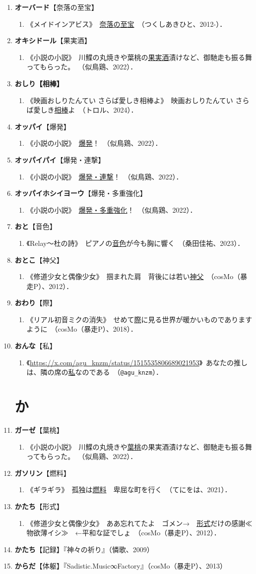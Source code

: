 \documentclass[twocolumn]{jsbook}
\newcommand{\exsentence}[3]{\item 《#1》\ #2\ （#3）．}
\newcommand{\exlist}[1]{
\begin{enumerate}[label= \raise0.2ex\hbox{\textcircled{\scriptsize{\arabic*}}}]
        #1
\end{enumerate}
}
\newcommand{\NoLabSectionTable}[1]{
    \section*{#1}
    \addcontentsline{toc}{section}{#1}
}
\begin{document}
\begin{enumerate}
    \item \textbf{オーバード}【奈落の至宝】
    \exlist{
        \exsentence{メイドインアビス}{\uline{奈落の至宝}}{つくしあきひと、2012-}
    }
    \item \textbf{オキシドール}【果実酒】
    \exlist{
        \exsentence{小説の小説}{川鰈の丸焼きや葉桃の\uline{果実酒}漬けなど、御馳走も振る舞ってもらった。}{似鳥鶏、2022}
    }
    \item \textbf{おしり【相棒】}
    \exlist{
        \exsentence{映画おしりたんてい さらば愛しき相棒よ}{映画おしりたんてい さらば愛しき\uline{相棒}よ}{トロル、2024}
    }
    \item \textbf{オッパイ}【爆発】
    \exlist{
        \exsentence{小説の小説}{\uline{爆発}！}{似鳥鶏、2022}
    }
    \item \textbf{オッパイパイ}【爆発・連撃】
    \exlist{
        \exsentence{小説の小説}{\uline{爆発・連撃}！}{似鳥鶏、2022}
    }
    \item \textbf{オッパイホシイヨーウ}【爆発・多重強化】
    \exlist{
        \exsentence{小説の小説}{\uline{爆発・多重強化}！}{似鳥鶏、2022}
    }
    \item \textbf{おと}【音色】
    \exlist{
        \exsentence{Relay〜杜の詩}{ピアノの\uline{音色}が今も胸に響く}{桑田佳祐、2023}
    }
    \item \textbf{おとこ}【神父】
    \exlist{
        \exsentence{修道少女と偶像少女}{掴まれた肩　背後には若い\uline{神父}}{cosMo（暴走P）、2012}
    }
    \item \textbf{おわり}【際】
    \exlist{
        \exsentence{リアル初音ミクの消失}{せめて\uline{際}に見る世界が暖かいものでありますように}{cosMo（暴走P）、2018}
    }
    \item \textbf{おんな}【私】
    \exlist{
        \exsentence{\url{https://x.com/agu_knzm/status/1515535806689021953}}{あなたの推しは、隣の席の\uline{私}なのである}{\texttt{@agu\_knzm}}
    }

\NoLabSectionTable{か}

    \item \textbf{ガーゼ}【葉桃】
    \exlist{
        \exsentence{小説の小説}{川鰈の丸焼きや\uline{葉桃}の果実酒漬けなど、御馳走も振る舞ってもらった。}{似鳥鶏、2022}
    }
    \item \textbf{ガソリン}【燃料】
    \exlist{
        \exsentence{ギラギラ}{孤独は\uline{燃料}　卑屈な町を行く}{てにをは、2021}
    }
    \item \textbf{かたち}【形式】
    \exlist{
        \exsentence{修道少女と偶像少女}{ああ忘れてたよ　ゴメン→　\uline{形式}だけの感謝≪物欲薄イシ≫　←平和な証でしょ}{cosMo（暴走P）、2012}
    }
    \item \textbf{かたち}【記録】『神々の祈り』（憐歌、2009）
    \item \textbf{からだ}【体躯】『Sadistic.Music∞Factory』（cosMo（暴走P）、2013）


\end{enumerate}
\end{document}
